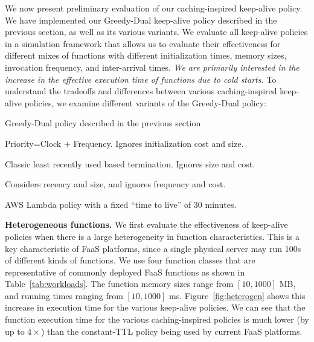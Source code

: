 We now present preliminary evaluation of our caching-inspired keep-alive policy. 
%
%
We have implemented our Greedy-Dual keep-alive policy described in the previous section, as well as its various variants. 
%
We evaluate all keep-alive policies in a simulation framework that allows us to evaluate their effectiveness for different mixes of functions with different initialization times, memory sizes, invocation frequency, and inter-arrival times. 
\emph{We are primarily interested in the increase in the effective execution time of functions due to  cold starts. }
To understand the tradeoffs and differences between various caching-inspired keep-alive policies, we examine different variants of the Greedy-Dual policy:
\vspace*{-5pt}
\begin{description}
  \setlength{\itemsep}{0pt}
\item[GD:] Greedy-Dual policy described in the previous section
\item[FREQ:] Priority=Clock + Frequency. Ignores initialization cost and size. 
  \item [LRU:] Classic least recently used based termination. Ignores size and cost. 
  \item[SIZE:] Considers recency and size, and ignores frequency and cost.
  \item[TTL:] AWS Lambda policy with a fixed ``time to live'' of 30 minutes. 
\end{description}



\noindent \textbf{Heterogeneous functions.}
We first evaluate the effectiveness of keep-alive policies when there is a large heterogeneity in function characteristics.
This is a key characteristic of FaaS platforms, since a single physical server may run 100s of different kinds of functions. 
We use four function classes that are representative of commonly deployed FaaS functions as shown in Table~\ref{tab:workloads}. 
The function  memory sizes range from $[10,1000]$ MB, and running times ranging from $[10, 1000]$ ms. 
Figure~\ref{fig:heterogen} shows this increase in execution time for the various keep-alive policies.
We can see that the function execution time for the various caching-inspired policies is much lower (by up to $4\times$) than the constant-TTL policy being used by current FaaS platforms. 


